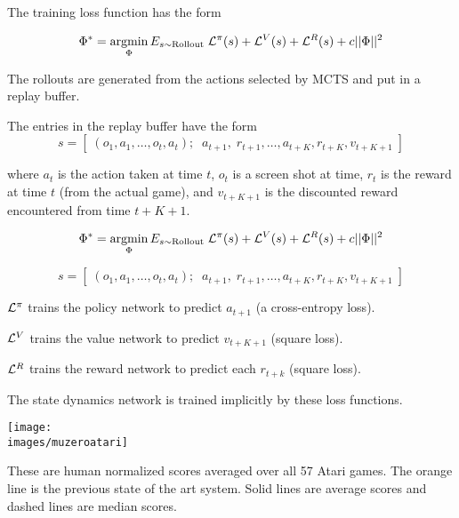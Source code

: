 {

{\huge
The training loss function has the form

$$\Phi^* = \operatorname*{argmin}_\Phi E_{s \sim \mathrm{Rollout}}\;{\cal L}^\pi(s) + {\cal L}^V(s) +{\cal L}^R(s) + c||\Phi||^2$$

\vfill
The rollouts are generated from the actions selected by MCTS and put in a replay buffer.

\vfill
The entries in the replay buffer have the form
$$s = \left[\;(o_1,a_1,\ldots,o_t,a_t);\;\;a_{t+1},\;r_{t+1},\ldots,a_{t+K},r_{t+K},v_{t+K+1}\;\right]$$

\vfill
where $a_t$ is the action taken at time $t$, $o_t$ is a screen shot at time, $r_t$ is the reward at time $t$ (from the actual game), and
$v_{t+K+1}$ is the discounted reward encountered from time $t+K+1$.
}

{\huge
$$\Phi^* = \operatorname*{argmin}_\Phi E_{s \sim \mathrm{Rollout}}\;{\cal L}^\pi(s) + {\cal L}^V(s) +{\cal L}^R(s) + c||\Phi||^2$$

$$s  = \left[\;(o_1,a_1,\ldots,o_t,a_t);\;\;a_{t+1},\;r_{t+1},\ldots,a_{t+K},r_{t+K},v_{t+K+1}\;\right]$$
  
\vfill
${\cal L}^\pi$ trains the policy network to predict $a_{t+1}$ (a cross-entropy loss).

\vfill
${\cal L}^V$ trains the value network to predict $v_{t+K+1}$ (square loss).

\vfill
${\cal L}^R$ trains the reward network to predict each $r_{t+k}$ (square loss).

\vfill
The state dynamics network is trained implicitly by these loss functions.
}



\centerline{\texttt{[image: \\images/muzeroatari]}}

{\huge
  These are human normalized scores averaged over all 57 Atari games.  The orange line is the previous state of the art system.  Solid lines are average scores and dashed lines are median scores.
}


}



